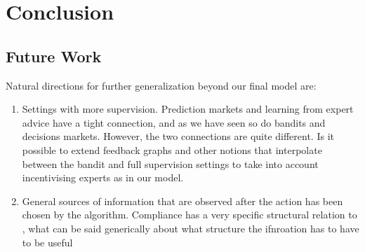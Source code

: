 \chapter{Conclusion}
\label{cha:conc}


\section{Future Work}
\label{sec:future}

Natural directions for further generalization beyond our final model are:

\begin{enumerate}

\item Settings with more supervision. Prediction markets and learning from expert advice have a tight connection, and as we have seen so do bandits and decisions markets. However, the two connections are quite different. Is it possible to extend feedback graphs and other notions that interpolate between the bandit and full supervision settings to take into account incentivising experts as in our model. 

\item General sources of information that are observed after the action has been chosen by the algorithm. Compliance has a very specific structural relation to , what can be said generically about what structure the ifnroation has to have to be useful

\end{enumerate}


